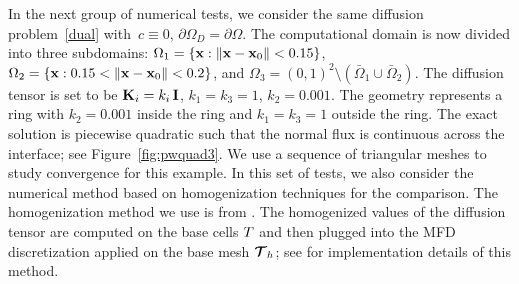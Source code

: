 In the next group of numerical tests, we consider the same  diffusion problem~\eqref{dual} with~$c \equiv 0$, $\partial\Omega_D = \partial\Omega$. The computational domain is now divided into three subdomains: $\Omega_1 = \{{\bf x} : \|{\bf x} - {\bf x}_0\| < 0.15\}$, $\Omega_2 = \{{\bf x} : 0.15 < \|{\bf x} - {\bf x}_0\| < 0.2\}$, and $\Omega_3 = (0,1)^2 \setminus (\bar{\Omega}_1\cup\bar{\Omega}_2)$. The diffusion tensor is set to be $\boldsymbol{\mathbf{K}}_i = k_i\,\boldsymbol{\mathbf{I}}$, $k_{1} = k_{3} = 1$, $k_2 = 0.001$. The geometry represents a ring with $k_2=0.001$ inside the ring and $k_{1} = k_{3} = 1$ outside the ring. The exact solution is piecewise quadratic such that the normal flux is continuous across the interface; see Figure~\ref{fig:pwquad3}. We use a sequence of triangular meshes to study convergence for this example. In this set of tests, we also consider the numerical method based on homogenization techniques for the comparison. The homogenization method we use is from \cite{dawes2013solving}. The homogenized values of the diffusion tensor are computed on the base cells $T$ and then plugged into the MFD discretization applied on the  base mesh ${\boldsymbol{\mathbf{\mathcal T}}}_h$; see \cite{kikinzon2017approximate} for implementation details of this method.

